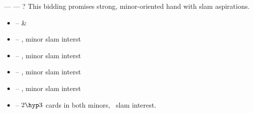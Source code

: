 \vspace{1em}

\begin{flushleft}
   ---  --- ? \linebreak
  This bidding promises strong, minor-oriented hand with slam aspirations.
\end{flushleft}
\begin{itemize}
  \item {} --  \& 
  \item {} -- , minor slam interst
  \item {} -- , minor slam interst
  \item {} -- , minor slam interst
  \item {} -- , minor slam interst
  \item {} -- $2\hyp 3$ cards in both minors, \no\ slam interest.
\end{itemize}
